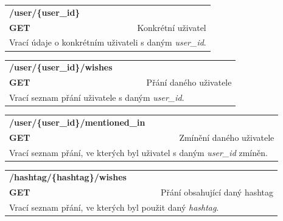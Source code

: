 \documentclass[thesis=B,czech]{FITthesis}[2012/06/26]
\begin{document}
\begin{table}[h]
\begin{tabular}{llllr}
\rowcolor[HTML]{EFEFEF}
\large \textbf{/user/\{user\_id\}}        &         &                 &        & \multicolumn{1}{l}{}                \\
\rowcolor[HTML]{EFEFEF}
\textbf{GET}          &         &                 &        & Konkrétní uživatel                        \\
\multicolumn{5}{l}{\parbox[t]{12.8cm}{Vrací údaje o konkrétním uživateli s daným \textit{user\_id}. }  } \\  
\end{tabular}
\end{table}


\begin{table}[h]
\begin{tabular}{llllr}
\rowcolor[HTML]{EFEFEF}
\large \textbf{/user/\{user\_id\}/wishes}        &         &                 &        & \multicolumn{1}{l}{}                \\
\rowcolor[HTML]{EFEFEF}
\textbf{GET}          &         &                 &        & Přání daného uživatele                        \\
\multicolumn{5}{l}{\parbox[t]{12.8cm}{Vrací seznam přání uživatele s daným \textit{user\_id}. }  } \\  
\end{tabular}
\end{table}

\begin{table}[h]
\begin{tabular}{llllr}
\rowcolor[HTML]{EFEFEF}
\large \textbf{/user/\{user\_id\}/mentioned\_in}        &         &                 &        & \multicolumn{1}{l}{}                \\
\rowcolor[HTML]{EFEFEF}
\textbf{GET}          &         &                 &        & Zmínění daného uživatele                        \\
\multicolumn{5}{l}{\parbox[t]{12.8cm}{Vrací seznam přání, ve kterých byl uživatel s daným \textit{user\_id} zmíněn. }  } \\  
\end{tabular}
\end{table}


\begin{table}[h]
\begin{tabular}{llllr}
\rowcolor[HTML]{EFEFEF}
\large \textbf{/hashtag/\{hashtag\}/wishes}        &         &                 &        & \multicolumn{1}{l}{}                \\
\rowcolor[HTML]{EFEFEF}
\textbf{GET}          &         &                 &        & Přání obsahující daný hashtag                       \\
\multicolumn{5}{l}{\parbox[t]{12.8cm}{Vrací seznam přání, ve kterých byl použit daný \textit{hashtag}. }  } \\  
\end{tabular}
\end{table}
\end{document}
